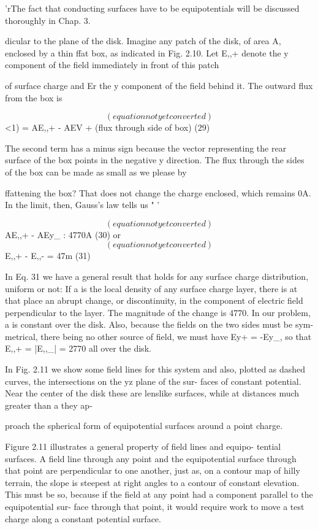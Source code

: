 'rThe fact that conducting surfaces have to be equipotentials will be discussed
thoroughly in Chap. 3.

dicular to the plane of the disk. Imagine any patch of the disk, of
area A, enclosed by a thin ffat box, as indicated in Fig. 2.10. Let E,,+
denote the y component of the field immediately in front of this patch

of surface charge and Er the y component of the field behind it. The
outward flux from the box is

\begin{equation}
(equation not yet converted)
\end{equation}
<1) = AE,,+ - AEV + (flux through side of box) (29)

The second term has a minus sign because the vector representing the
rear surface of the box points in the negative y direction. The flux
through the sides of the box can be made as small as we please by

ffattening the box? That does not change the charge enclosed, which
remains 0A. In the limit, then, Gauss's law tells us " '

\begin{equation}
(equation not yet converted)
\end{equation}
AE,,+ - AEy_ : 4770A (30)
or
\begin{equation}
(equation not yet converted)
\end{equation}
E,,+ - E,,- = 47m (31)

In Eq. 31 we have a general result that holds for any surface charge
distribution, uniform or not: If a is the local density of any surface
charge layer, there is at that place an abrupt change, or discontinuity,
in the component of electric field perpendicular to the layer. The
magnitude of the change is 4770. In our problem, a is constant over
the disk. Also, because the fields on the two sides must be sym-
metrical, there being no other source of field, we must have
Ey+ = -Ey_, so that E,,+ = |E,,_| = 2770 all over the disk.

In Fig. 2.11 we show some field lines for this system and also,
plotted as dashed curves, the intersections on the yz plane of the sur-
faces of constant potential. Near the center of the disk these are
lenslike surfaces, while at distances much greater than a they ap-

proach the spherical form of equipotential surfaces around a point
charge.

Figure 2.11 illustrates a general property of field lines and equipo-
tential surfaces. A field line through any point and the equipotential
surface through that point are perpendicular to one another, just as,
on a contour map of hilly terrain, the slope is steepest at right angles
to a contour of constant elevation. This must be so, because if the
field at any point had a component parallel to the equipotential sur-
face through that point, it would require work to move a test charge
along a constant potential surface.


